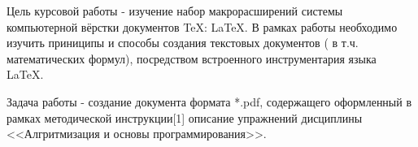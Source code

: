 \setcounter{page}{3}
\setlength{\parskip}{5pt}
\setlength{\parindent}{1,25cm}
\linespread{1.3}
\pagestyle{plain}
\fontsize{14pt}{16.8pt}\selectfont

\newpage
\begin{center}
\label{sec:intro}
\end{center}
\par
\fontsize{14pt}{16.8pt}\selectfont
Цель курсовой работы - изучение набор макрорасширений системы компьютерной вёрстки документов TeX: LaTeX. В рамках работы необходимо изучить приниципы и способы создания текстовых документов ( в т.ч. математических формул), посредством встроенного инструментария языка LaTeX.
\par
\fontsize{14pt}{16.8pt}\selectfont
Задача работы - создание документа формата *.pdf, содержащего оформленный в рамках методической инструкции[1] описание упражнений дисциплины <<Алгритмизация и основы программирования>>.

